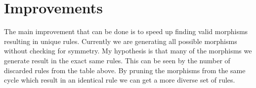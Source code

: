 \documentclass{article}
\begin{document}
\begin{figure}[h!]
\end{figure}

\newpage
\section{Improvements}
The main improvement that can be done is to speed up finding valid morphisms resulting in unique rules. Currently we are generating all possible morphisms without checking for symmetry. My hypothesis is that many of the morphisms we generate result in the exact same rules. This can be seen by the number of discarded rules from the table above. By pruning the morphisms from the same cycle which result in an identical rule we can get a more diverse set of rules.
\end{document}
